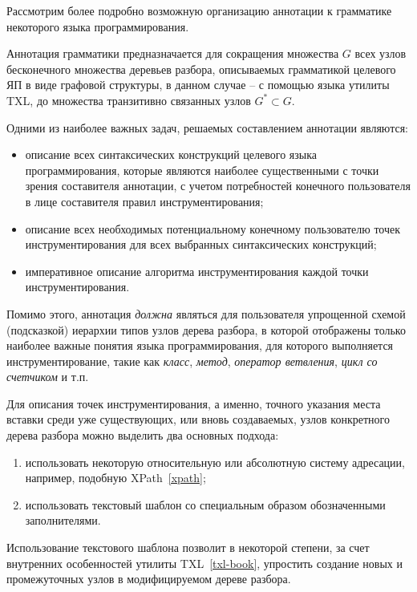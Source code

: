 Рассмотрим более подробно возможную организацию аннотации к грамматике некоторого языка программирования.

Аннотация грамматики предназначается для сокращения множества $G$ всех узлов бесконечного множества деревьев разбора, описываемых грамматикой целевого ЯП в виде графовой структуры, в данном случае -- с помощью языка утилиты TXL, до множества транзитивно связанных узлов $G^* \subset G$.

Одними из наиболее важных задач, решаемых составлением аннотации являются:

\begin{itemize}[noitemsep]
  \item описание всех синтаксических конструкций целевого языка программирования, которые являются наиболее существенными с точки зрения составителя аннотации, с учетом потребностей конечного пользователя в лице составителя правил инструментирования;
  \item описание всех необходимых потенциальному конечному пользователю точек инструментирования для всех выбранных синтаксических конструкций;
  \item императивное описание алгоритма инструментирования каждой точки инструментирования.
\end{itemize}

Помимо этого, аннотация \textit{должна} являться для пользователя упрощенной схемой (подсказкой) иерархии типов узлов дерева разбора, в которой отображены только наиболее важные понятия языка программирования, для которого выполняется инструментирование, такие как \textit{класс}, \textit{метод}, \textit{оператор ветвления}, \textit{цикл со счетчиком} и т.п.

Для описания точек инструментирования, а именно, точного указания места вставки среди уже существующих, или вновь создаваемых, узлов конкретного дерева разбора можно выделить два основных подхода:

\begin{enumerate}[noitemsep]
  \item использовать некоторую относительную или абсолютную систему адресации, например, подобную XPath~\ref{xpath};
  \item использовать текстовый шаблон со специальным образом обозначенными заполнителями.
\end{enumerate}

Использование текстового шаблона позволит в некоторой степени, за счет внутренних особенностей утилиты TXL~\ref{txl-book}, упростить создание новых и промежуточных узлов в модифицируемом дереве разбора.

